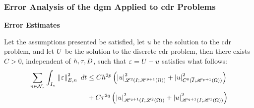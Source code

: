 \begin{frame}
    \frametitle{Error Analysis of the \acrshort{dgm} Applied to \acrshort{cdr} Problems}

    \vspace*{\fill}
    \begin{center}
        {\color{\accentcolor} \Large \textbf{Error Estimates}}
        \vspace*{0.25cm}

        \begin{minipage}{0.75\textwidth}
            \begin{theorem} \label{theorem:estimates_ht}
                Let the assumptions presented be satisfied, let $u$ be the solution to the \acrshort{cdr} problem, and let $U$ be the solution to the discrete \acrshort{cdr} problem, then there exists $C > 0$, independent of $h, \tau, D$, such that $\varepsilon = U - u$ satisfies what follows:
                \begin{align*}
                    \sum_{n \in \mathcal{N}_{\tau}} \int_{I_n}  \left\lVert \varepsilon \right\rVert_{E, n}^2  ~ d t &\leq C h^{2p} \left( \left\lvert u \right\rvert_{\mathscr{L}^{2}(I; \mathscr{H}^{p + 1}(\Omega))}^2 + \left\lvert u \right\rvert_{C^0(\overline{I}; \mathscr{H}^{p + 1}(\Omega))}^2 \right) \\
                    &+ C \tau^{2q} \left( \left\lvert u \right\rvert_{\mathscr{H}^{q + 1}(I; \mathscr{L}^{2}(\Omega))}^2 + \left\lvert u \right\rvert_{\mathscr{H}^{q + 1}(I; \mathscr{H}^{1}(\Omega))}^2 \right)
                \end{align*}
            \end{theorem}
        \end{minipage}
    \end{center}
    \vspace*{\fill}
    
\end{frame}